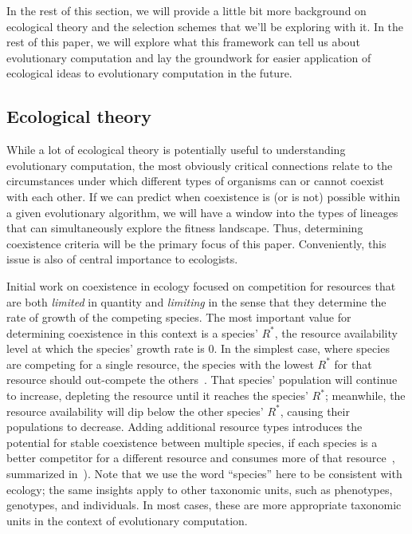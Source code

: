 In the rest of this section, we will provide a little bit more background on ecological theory and the selection schemes that we'll be exploring with it. In the rest of this paper, we will explore what this framework can tell us about evolutionary computation and lay the groundwork for easier application of ecological ideas to evolutionary computation in the future.

\subsection{Ecological theory}

While a lot of ecological theory is potentially useful to understanding evolutionary computation, the most obviously critical connections relate to the circumstances under which different types of organisms can or cannot coexist with each other. If we can predict when coexistence is (or is not) possible within a given evolutionary algorithm, we will have a window into the types of lineages that can simultaneously explore the fitness landscape. Thus, determining coexistence criteria will be the primary focus of this paper. Conveniently, this issue is also of central importance to ecologists.

Initial work on coexistence in ecology focused on competition for resources that are both \textit{limited} in quantity and \textit{limiting} in the sense that they determine the rate of growth of the competing species. The most important value for determining coexistence in this context is a species' $R^{*}$, the resource availability level at which the species' growth rate is 0. In the simplest case, where species are competing for a single resource, the species with the lowest $R^*$ for that resource should out-compete the others~\cite{grover_resource_1997}. That species' population will continue to increase, depleting the resource until it reaches the species' $R^*$; meanwhile, the resource availability will dip below the other species' $R^*$, causing their populations to decrease. Adding additional resource  types introduces the potential for stable coexistence between multiple species, if each species is a better competitor for a different resource and consumes more of that resource~\cite{chase_ecological_2003}, summarized in~\cite{letten_linking_2017}). Note that we use the word ``species'' here to be consistent with ecology; the same insights apply to other taxonomic units, such as phenotypes, genotypes, and individuals. In most cases, these are more appropriate taxonomic units in the context of evolutionary computation.

